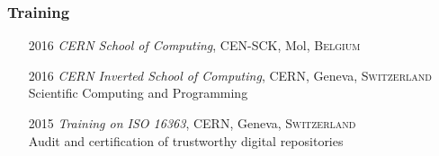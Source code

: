 \documentclass[12pt,a4paper]{article}
\begin{document}
\subsubsection*{Training}
\begin{itemize}
	\item[2016] \emph{CERN School of Computing}, {CEN-SCK}, Mol,
		\textsc{Belgium}
	\item[2016] \emph{CERN Inverted School of Computing},  {CERN}, Geneva,
		\textsc{Switzerland}\\
	{\small Scientific Computing and Programming}
	\item[2015] \emph{Training on ISO 16363}, {CERN}, Geneva, \textsc{Switzerland}\\
	{\small Audit and certification of trustworthy digital repositories}
\end{itemize}
\end{document}
